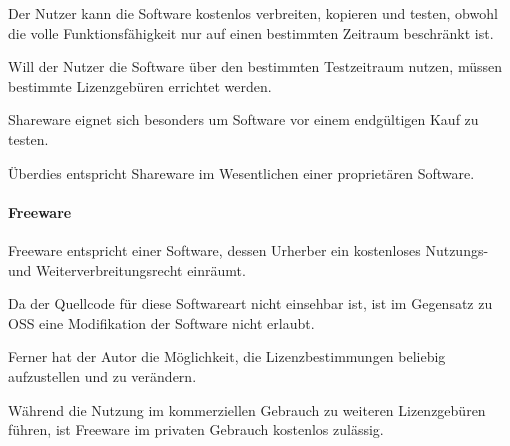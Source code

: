 Der Nutzer kann die Software kostenlos verbreiten, kopieren und testen, obwohl die volle Funktionsfähigkeit nur auf einen bestimmten Zeitraum beschränkt ist. 

Will der Nutzer die Software über den bestimmten Testzeitraum nutzen, müssen bestimmte Lizenzgebüren errichtet werden. 

Shareware eignet sich besonders um Software vor einem endgültigen Kauf zu testen. 

Überdies entspricht Shareware im Wesentlichen einer proprietären Software.

\paragraph{Freeware}
Freeware entspricht einer Software, dessen Urherber ein kostenloses Nutzungs- und Weiterverbreitungsrecht einräumt. 

Da der Quellcode für diese Softwareart nicht einsehbar ist, ist im Gegensatz zu OSS eine Modifikation der Software nicht erlaubt. 

Ferner hat der Autor die Möglichkeit, die Lizenzbestimmungen beliebig aufzustellen und zu verändern. 

Während die Nutzung im kommerziellen Gebrauch zu weiteren Lizenzgebüren führen, ist Freeware im privaten Gebrauch kostenlos zulässig. 



